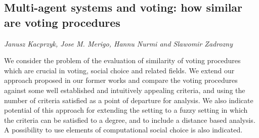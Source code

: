 \documentclass[../booklet.tex]{subfiles}
\begin{document}
\subsection[Multi-agent systems and voting: how similar are voting procedures. {\it Janusz Kacprzyk, Jose M. Merigo, Hannu Nurmi and Slawomir Zadrozny}]{Multi-agent systems and voting: how similar are voting procedures}
   

\begin{center}
  {\it Janusz Kacprzyk, Jose M. Merigo, Hannu Nurmi and Slawomir Zadrozny}
\end{center}



We consider the problem of the evaluation of similarity of voting procedures which are crucial in voting, social choice and related fields. We extend our approach 
proposed in our former works and compare the voting procedures against some well established and intuitively appealing 
criteria, and using the number of criteria satisfied as a point of departure for analysis. We also indicate potential of this approach for 
extending the setting to a fuzzy setting in which the criteria can be satisfied to a degree, and to include  a distance based analysis. A possibility to use elements of computational social choice is also indicated.\\[0.5cm]
\end{document}

